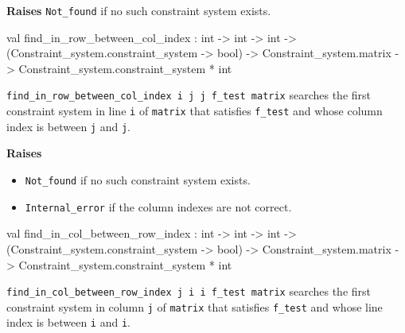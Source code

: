 \begin{ocamldocsigend}
\begin{ocamldocdescription}
{\bf Raises} {\tt{Not\_found}} if no such constraint system exists.


\end{ocamldocdescription}


\label{val:Constraint-underscoresystem.Matrix.find-underscorein-underscorerow-underscorebetween-underscorecol-underscoreindex}\begin{ocamldoccode}
val find_in_row_between_col_index :
  int ->
  int ->
  int ->
  (Constraint_system.constraint_system -> bool) ->
  Constraint_system.matrix -> Constraint_system.constraint_system * int
\end{ocamldoccode}
\begin{ocamldocdescription}
{\tt{find\_in\_row\_between\_col\_index i j j{\textquotesingle} f\_test matrix}} searches the first constraint system in line {\tt{i}} of {\tt{matrix}} that satisfies {\tt{f\_test}}
      and whose column index is between {\tt{j}} and {\tt{j{\textquotesingle}}}.

{\bf Raises} \begin{itemize}
\item {\tt{Not\_found}} if no such constraint system exists.
\item {\tt{Internal\_error}} if the column indexes are not correct. \lowdebug 
\end{itemize}



\end{ocamldocdescription}


\label{val:Constraint-underscoresystem.Matrix.find-underscorein-underscorecol-underscorebetween-underscorerow-underscoreindex}\begin{ocamldoccode}
val find_in_col_between_row_index :
  int ->
  int ->
  int ->
  (Constraint_system.constraint_system -> bool) ->
  Constraint_system.matrix -> Constraint_system.constraint_system * int
\end{ocamldoccode}
\begin{ocamldocdescription}
{\tt{find\_in\_col\_between\_row\_index j i i{\textquotesingle} f\_test matrix}} searches the first constraint system in column {\tt{j}} of {\tt{matrix}} that satisfies {\tt{f\_test}}
      and whose line index is between {\tt{i}} and {\tt{i{\textquotesingle}}}.


\end{ocamldocdescription}
\end{ocamldocsigend}
